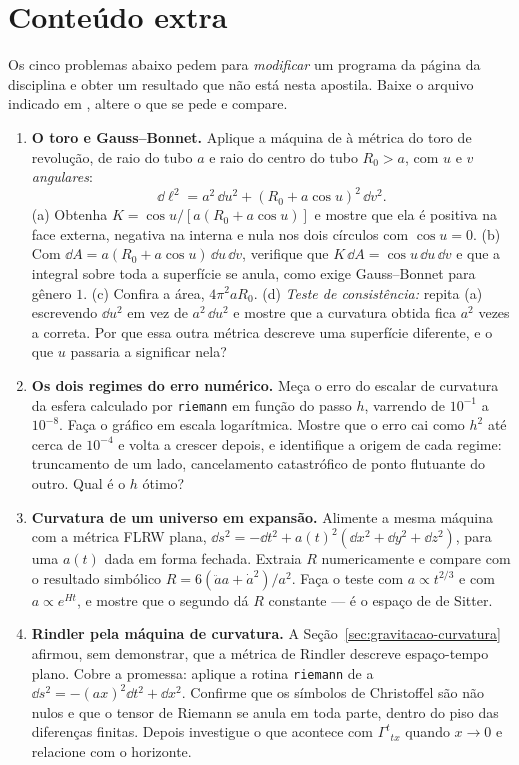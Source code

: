 \documentclass[12pt,a4paper,oneside]{book}
\theoremstyle{rgplain}
\theoremstyle{rgremark}
\begin{document}
\section{Conteúdo extra}

Os cinco problemas abaixo pedem para \emph{modificar} um programa da página da disciplina e obter um resultado que não está nesta apostila. Baixe o arquivo indicado em \href{\rgsitecodigos}{\texttt{\rgsitecodigos}}, altere o que se pede e compare.

\begin{enumerate}
  \item \textbf{O toro e Gauss--Bonnet.} Aplique a máquina de
 à métrica do toro de revolução, de raio do tubo $a$
e raio do centro do tubo $R_0>a$, com $u$ e $v$ \emph{angulares}:
\[
  \dd\ell^2=a^2\,\dd u^2+(R_0+a\cos u)^2\,\dd v^2 .
\]
(a) Obtenha $K=\cos u/[a(R_0+a\cos u)]$ e mostre que ela é positiva na face
externa, negativa na interna e nula nos dois círculos com $\cos u=0$.
(b) Com $\dd A=a(R_0+a\cos u)\,\dd u\,\dd v$, verifique que $K\,\dd A=\cos
u\,\dd u\,\dd v$ e que a integral sobre toda a superfície se anula, como exige
Gauss--Bonnet para gênero $1$. (c) Confira a área, $4\pi^2aR_0$.
(d) \emph{Teste de consistência:} repita (a) escrevendo $\dd u^2$ em vez de
$a^2\,\dd u^2$ e mostre que a curvatura obtida fica $a^2$ vezes a correta.
Por que essa outra métrica descreve uma superfície diferente, e o que $u$
passaria a significar nela?

  \item \textbf{Os dois regimes do erro numérico.} Meça o erro do escalar de
curvatura da esfera calculado por \texttt{riemann} em função do passo $h$,
varrendo de $10^{-1}$ a $10^{-8}$. Faça o gráfico em escala logarítmica.
Mostre que o erro cai como $h^2$ até cerca de $10^{-4}$ e volta a crescer
depois, e identifique a origem de cada regime: truncamento de um lado,
cancelamento catastrófico de ponto flutuante do outro. Qual é o $h$ ótimo?

  \item \textbf{Curvatura de um universo em expansão.} Alimente a mesma máquina com
a métrica FLRW plana, $\dd s^2=-\dd t^2+a(t)^2(\dd x^2+\dd y^2+\dd z^2)$,
para uma $a(t)$ dada em forma fechada. Extraia $R$ numericamente e compare
com o resultado simbólico $R=6(\ddot a a+\dot a^2)/a^2$. Faça o teste com
$a\propto t^{2/3}$ e com $a\propto e^{Ht}$, e mostre que o segundo dá $R$
constante --- é o espaço de de Sitter.

  \item \textbf{Rindler pela máquina de curvatura.} A
Seção~\ref{sec:gravitacao-curvatura} afirmou, sem demonstrar, que a métrica de
Rindler descreve espaço-tempo plano. Cobre a promessa: aplique a rotina
\texttt{riemann} de  a
$\dd s^2=-(ax)^2\dd t^2+\dd x^2$. Confirme que os símbolos de Christoffel são
não nulos e que o tensor de Riemann se anula em toda parte, dentro do piso das
diferenças finitas. Depois investigue o que acontece com $\Gamma^t{}_{tx}$
quando $x\to0$ e relacione com o horizonte.


\end{enumerate}
\end{document}
